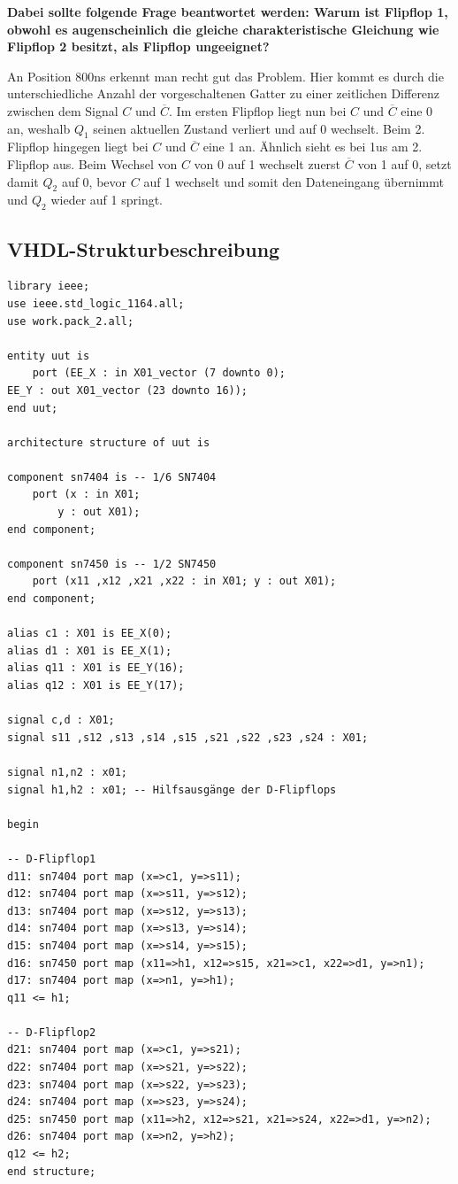 \documentclass[fleqn]{article}
\begin{document}
\textbf{Dabei sollte folgende Frage beantwortet werden: Warum ist Flipflop 1, obwohl es augenscheinlich die gleiche charakteristische Gleichung wie Flipflop 2 besitzt, als Flipflop ungeeignet?}

An Position 800ns erkennt man recht gut das Problem. 
Hier kommt es durch die unterschiedliche Anzahl der vorgeschaltenen Gatter zu einer zeitlichen Differenz zwischen dem Signal $C$ und $\overline{C}$. 
Im ersten Flipflop liegt nun bei $C$ und $\overline{C}$ eine 0 an, 
weshalb $Q_1$ seinen aktuellen Zustand verliert und auf 0 wechselt. 
Beim 2. Flipflop hingegen liegt bei $C$ und $\overline{C}$ eine 1 an. 
Ähnlich sieht es bei 1us am 2. Flipflop aus. 
Beim Wechsel von $C$ von 0 auf 1 wechselt zuerst $\overline{C}$ von 1 auf 0, 
setzt damit $Q_2$ auf 0, bevor $C$ auf 1 wechselt und somit den Dateneingang übernimmt und $Q_2$ wieder auf 1 springt. 
\\
\subsection{VHDL-Strukturbeschreibung}

\begin{lstlisting}
library ieee; 
use ieee.std_logic_1164.all; 
use work.pack_2.all;

entity uut is 
    port (EE_X : in X01_vector (7 downto 0); 
EE_Y : out X01_vector (23 downto 16));
end uut; 

architecture structure of uut is

component sn7404 is -- 1/6 SN7404 
    port (x : in X01; 
        y : out X01); 
end component;

component sn7450 is -- 1/2 SN7450 
    port (x11 ,x12 ,x21 ,x22 : in X01; y : out X01); 
end component;

alias c1 : X01 is EE_X(0); 
alias d1 : X01 is EE_X(1); 
alias q11 : X01 is EE_Y(16); 
alias q12 : X01 is EE_Y(17); 

signal c,d : X01; 
signal s11 ,s12 ,s13 ,s14 ,s15 ,s21 ,s22 ,s23 ,s24 : X01; 

signal n1,n2 : x01; 
signal h1,h2 : x01; -- Hilfsausgänge der D-Flipflops

begin 

-- D-Flipflop1 
d11: sn7404 port map (x=>c1, y=>s11); 
d12: sn7404 port map (x=>s11, y=>s12); 
d13: sn7404 port map (x=>s12, y=>s13); 
d14: sn7404 port map (x=>s13, y=>s14);
d15: sn7404 port map (x=>s14, y=>s15);  
d16: sn7450 port map (x11=>h1, x12=>s15, x21=>c1, x22=>d1, y=>n1);
d17: sn7404 port map (x=>n1, y=>h1);
q11 <= h1;  

-- D-Flipflop2 
d21: sn7404 port map (x=>c1, y=>s21); 
d22: sn7404 port map (x=>s21, y=>s22); 
d23: sn7404 port map (x=>s22, y=>s23); 
d24: sn7404 port map (x=>s23, y=>s24); 
d25: sn7450 port map (x11=>h2, x12=>s21, x21=>s24, x22=>d1, y=>n2);
d26: sn7404 port map (x=>n2, y=>h2); 
q12 <= h2;
end structure;
\end{lstlisting}
\end{document}

